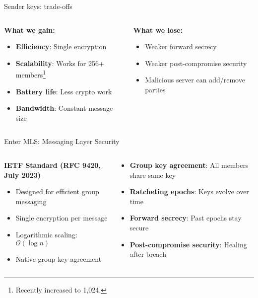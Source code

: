 \documentclass[aspectratio=169, lualatex, handout]{beamer}
\begin{document}
\begin{frame}{Sender keys: trade-offs}
	\begin{columns}[c]
		\begin{column}{0.5\textwidth}
			\textbf{What we gain:}
			\begin{itemize}
				\item \textbf{Efficiency}: Single encryption
				\item \textbf{Scalability}: Works for 256+ members\footnote{Recently increased to 1,024.}
				\item \textbf{Battery life}: Less crypto work
				\item \textbf{Bandwidth}: Constant message size
			\end{itemize}
		\end{column}
		\begin{column}{0.5\textwidth}
			\textbf{What we lose:}
			\begin{itemize}
				\item Weaker forward secrecy
				\item Weaker post-compromise security
				\item Malicious server can add/remove parties
			\end{itemize}
		\end{column}
	\end{columns}
\end{frame}

\begin{frame}{Enter MLS: Messaging Layer Security}
	\begin{columns}[c]
		\begin{column}{0.5\textwidth}
			\textbf{IETF Standard (RFC 9420, July 2023)}
			\begin{itemize}
				\item Designed for efficient group messaging
				\item Single encryption per message
				\item Logarithmic scaling: $\mathcal{O}(\log n)$
				\item Native group key agreement
			\end{itemize}
		\end{column}
		\begin{column}{0.5\textwidth}
			\begin{itemize}
				\item \textbf{Group key agreement}: All members share same key
				\item \textbf{Ratcheting epochs}: Keys evolve over time
				\item \textbf{Forward secrecy}: Past epochs stay secure
				\item \textbf{Post-compromise security}: Healing after breach
			\end{itemize}
		\end{column}
	\end{columns}
\end{frame}
\end{document}
